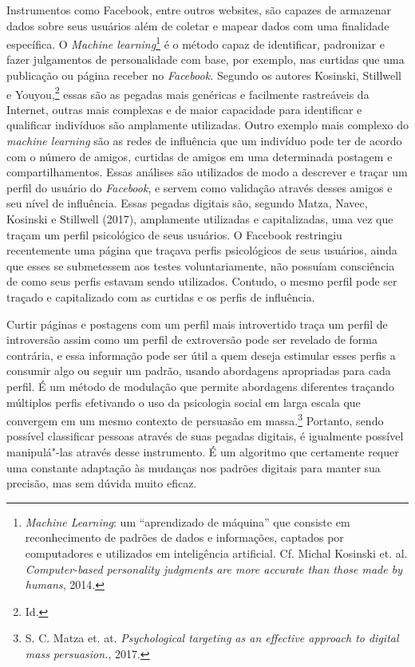 Instrumentos como Facebook, entre outros websites, são capazes de
armazenar dados sobre seus usuários além de coletar e mapear dados com
uma finalidade específica. O \emph{Machine learning}\footnote{\emph{Machine
  Learning}: um ``aprendizado de máquina'' que consiste em reconhecimento
  de padrões de dados e informações, captados por computadores e
  utilizados em inteligência artificial. Cf. Michal Kosinski et. al. \emph{Computer-based
personality judgments are more accurate than those made by
humans}, 2014.} é o método capaz de identificar, padronizar e fazer julgamentos
de personalidade com base, por exemplo, nas curtidas que uma publicação
ou página receber no \emph{Facebook.} Segundo os autores
Kosinski, Stillwell e Youyou,\footnote{Id.} essas são as pegadas mais genéricas
e facilmente rastreáveis da Internet, outras mais complexas e de maior
capacidade para identificar e qualificar indivíduos são amplamente
utilizadas. Outro exemplo mais complexo do \emph{machine learning} são
as redes de influência que um indivíduo pode ter de acordo com o número
de amigos, curtidas de amigos em uma determinada postagem e
compartilhamentos. Essas análises são utilizados de modo a descrever
e traçar um perfil do usuário do \emph{Facebook}, e servem como
validação através desses amigos e seu nível de influência. Essas pegadas
digitais são, segundo Matza, Navec, Kosinski e Stillwell (2017),
amplamente utilizadas e capitalizadas, uma vez que traçam um perfil
psicológico de seus usuários. O Facebook restringiu recentemente uma
página que traçava perfis psicológicos de seus usuários, ainda que esses
se submetessem aos testes voluntariamente, não possuíam consciência de
como seus perfis estavam sendo utilizados. Contudo, o mesmo perfil pode
ser traçado e capitalizado com as curtidas e os perfis de influência.

Curtir páginas e postagens com um perfil mais introvertido traça um
perfil de introversão assim como um perfil de extroversão pode ser
revelado de forma contrária, e essa informação pode ser útil a quem
deseja estimular esses perfis a consumir algo ou seguir um padrão,
usando abordagens apropriadas para cada perfil. É um método de modulação
que permite abordagens diferentes traçando múltiplos perfis efetivando o
uso da psicologia social em larga escala que convergem em um mesmo
contexto de persuasão em massa.\footnote{S. C. Matza et. at. \emph{Psychological targeting as an effective approach to digital mass persuasion.}, 2017.}
Portanto, sendo possível classificar pessoas através de suas pegadas
digitais, é igualmente possível manipulá"-las através desse instrumento.
É um algoritmo que certamente requer uma constante adaptação às mudanças
nos padrões digitais para manter sua precisão, mas sem dúvida muito
eficaz.

